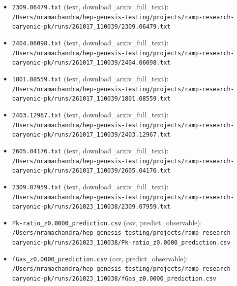 \documentclass[11pt,a4paper]{article}
\begin{document}
\begin{itemize}
  \item \texttt{2309.06479.txt} (text, download\_arxiv\_full\_text): \texttt{/\allowbreak{}Users/\allowbreak{}nramachandra/\allowbreak{}hep-genesis-testing/\allowbreak{}projects/\allowbreak{}ramp-research-baryonic-pk/\allowbreak{}runs/\allowbreak{}261017\_\allowbreak{}110039/\allowbreak{}2309.06479.txt}
  \item \texttt{2404.06098.txt} (text, download\_arxiv\_full\_text): \texttt{/\allowbreak{}Users/\allowbreak{}nramachandra/\allowbreak{}hep-genesis-testing/\allowbreak{}projects/\allowbreak{}ramp-research-baryonic-pk/\allowbreak{}runs/\allowbreak{}261017\_\allowbreak{}110039/\allowbreak{}2404.06098.txt}
  \item \texttt{1801.08559.txt} (text, download\_arxiv\_full\_text): \texttt{/\allowbreak{}Users/\allowbreak{}nramachandra/\allowbreak{}hep-genesis-testing/\allowbreak{}projects/\allowbreak{}ramp-research-baryonic-pk/\allowbreak{}runs/\allowbreak{}261017\_\allowbreak{}110039/\allowbreak{}1801.08559.txt}
  \item \texttt{2403.12967.txt} (text, download\_arxiv\_full\_text): \texttt{/\allowbreak{}Users/\allowbreak{}nramachandra/\allowbreak{}hep-genesis-testing/\allowbreak{}projects/\allowbreak{}ramp-research-baryonic-pk/\allowbreak{}runs/\allowbreak{}261017\_\allowbreak{}110039/\allowbreak{}2403.12967.txt}
  \item \texttt{2605.04176.txt} (text, download\_arxiv\_full\_text): \texttt{/\allowbreak{}Users/\allowbreak{}nramachandra/\allowbreak{}hep-genesis-testing/\allowbreak{}projects/\allowbreak{}ramp-research-baryonic-pk/\allowbreak{}runs/\allowbreak{}261017\_\allowbreak{}110039/\allowbreak{}2605.04176.txt}
  \item \texttt{2309.07959.txt} (text, download\_arxiv\_full\_text): \texttt{/\allowbreak{}Users/\allowbreak{}nramachandra/\allowbreak{}hep-genesis-testing/\allowbreak{}projects/\allowbreak{}ramp-research-baryonic-pk/\allowbreak{}runs/\allowbreak{}261023\_\allowbreak{}110038/\allowbreak{}2309.07959.txt}
  \item \texttt{Pk-ratio\_\allowbreak{}z0.0000\_\allowbreak{}prediction.csv} (csv, predict\_observable): \texttt{/\allowbreak{}Users/\allowbreak{}nramachandra/\allowbreak{}hep-genesis-testing/\allowbreak{}projects/\allowbreak{}ramp-research-baryonic-pk/\allowbreak{}runs/\allowbreak{}261023\_\allowbreak{}110038/\allowbreak{}Pk-ratio\_\allowbreak{}z0.0000\_\allowbreak{}prediction.csv}
  \item \texttt{fGas\_\allowbreak{}z0.0000\_\allowbreak{}prediction.csv} (csv, predict\_observable): \texttt{/\allowbreak{}Users/\allowbreak{}nramachandra/\allowbreak{}hep-genesis-testing/\allowbreak{}projects/\allowbreak{}ramp-research-baryonic-pk/\allowbreak{}runs/\allowbreak{}261023\_\allowbreak{}110038/\allowbreak{}fGas\_\allowbreak{}z0.0000\_\allowbreak{}prediction.csv}

\end{itemize}
\end{document}
